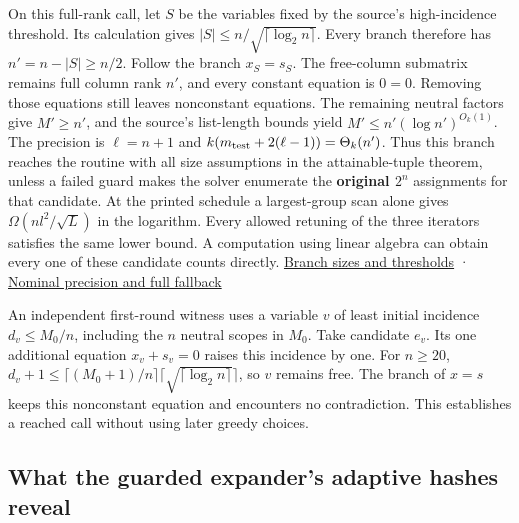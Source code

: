 \documentclass[
  11pt,
]{article}
\begin{document}
On this full-rank call, let \(S\) be the variables fixed by the source's
high-incidence threshold. Its calculation gives
\(|S|\le n/\sqrt{\lceil\log_2n\rceil}\). Every branch therefore has
\(n'=n-|S|\ge n/2\). Follow the branch \(x_S=s_S\). The free-column
submatrix remains full column rank \(n'\), and every constant equation
is \(0=0\). Removing those equations still leaves nonconstant equations.
The remaining neutral factors give \(M'\ge n'\), and the source's
list-length bounds yield \(M'\le n'(\log n')^{O_k(1)}\). The precision
is \(\ell=n+1\) and \(k(m_{\rm test}+2(\ell-1))=\Theta_k(n')\). Thus
this branch reaches the routine with all size assumptions in the
attainable-tuple theorem, unless a failed guard makes the solver
enumerate the \textbf{original \(2^n\)} assignments for that candidate.
At the printed schedule a largest-group scan alone gives
\(\Omega(nl^2/\sqrt L)\) in the logarithm. Every allowed retuning of the
three iterators satisfies the same lower bound. A computation using
linear algebra can obtain every one of these candidate counts directly.
\href{https://github.com/openai/math/blob/main/preprints/The-Exponential-Time-Hypothesis-is-False-October-25-2026/build/main_full_version.tex\#L3096-L3145}{Branch
sizes and thresholds} ·
\href{https://github.com/openai/math/blob/main/preprints/The-Exponential-Time-Hypothesis-is-False-October-25-2026/build/main_full_version.tex\#L3169-L3196}{Nominal
precision and full fallback}

An independent first-round witness uses a variable \(v\) of least
initial incidence \(d_v\le M_0/n\), including the \(n\) neutral scopes
in \(M_0\). Take candidate \(e_v\). Its one additional equation
\(x_v+s_v=0\) raises this incidence by one. For \(n\ge20\),
\(d_v+1\le\lceil (M_0+1)/n\rceil\lceil\sqrt{\lceil\log_2n\rceil}\rceil\),
so \(v\) remains free. The branch of \(x=s\) keeps this nonconstant
equation and encounters no contradiction. This establishes a reached
call without using later greedy choices.

\subsection{What the guarded expander's adaptive hashes
reveal}\label{what-the-guarded-expanders-adaptive-hashes-reveal}
\end{document}
